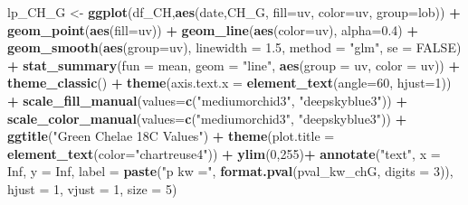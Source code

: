 \documentclass[
]{article}
\newenvironment{Shaded}{\begin{snugshade}}{\end{snugshade}}
\newcommand{\AttributeTok}[1]{\textcolor[rgb]{0.13,0.29,0.53}{#1}}
\newcommand{\ConstantTok}[1]{\textcolor[rgb]{0.56,0.35,0.01}{#1}}
\newcommand{\DecValTok}[1]{\textcolor[rgb]{0.00,0.00,0.81}{#1}}
\newcommand{\FloatTok}[1]{\textcolor[rgb]{0.00,0.00,0.81}{#1}}
\newcommand{\FunctionTok}[1]{\textcolor[rgb]{0.13,0.29,0.53}{\textbf{#1}}}
\newcommand{\NormalTok}[1]{#1}
\newcommand{\OtherTok}[1]{\textcolor[rgb]{0.56,0.35,0.01}{#1}}
\newcommand{\SpecialCharTok}[1]{\textcolor[rgb]{0.81,0.36,0.00}{\textbf{#1}}}
\newcommand{\StringTok}[1]{\textcolor[rgb]{0.31,0.60,0.02}{#1}}
\begin{document}
\begin{Shaded}
\begin{Highlighting}[]
\NormalTok{lp\_CH\_G }\OtherTok{\textless{}{-}} \FunctionTok{ggplot}\NormalTok{(df\_CH,}\FunctionTok{aes}\NormalTok{(date,CH\_G, }\AttributeTok{fill=}\NormalTok{uv, }\AttributeTok{color=}\NormalTok{uv, }\AttributeTok{group=}\NormalTok{lob)) }\SpecialCharTok{+}
  \FunctionTok{geom\_point}\NormalTok{(}\FunctionTok{aes}\NormalTok{(}\AttributeTok{fill=}\NormalTok{uv)) }\SpecialCharTok{+} \FunctionTok{geom\_line}\NormalTok{(}\FunctionTok{aes}\NormalTok{(}\AttributeTok{color=}\NormalTok{uv), }\AttributeTok{alpha=}\FloatTok{0.4}\NormalTok{) }\SpecialCharTok{+} 
  \FunctionTok{geom\_smooth}\NormalTok{(}\FunctionTok{aes}\NormalTok{(}\AttributeTok{group=}\NormalTok{uv), }\AttributeTok{linewidth =} \FloatTok{1.5}\NormalTok{, }\AttributeTok{method =} \StringTok{"glm"}\NormalTok{, }\AttributeTok{se =} \ConstantTok{FALSE}\NormalTok{) }\SpecialCharTok{+}
  \FunctionTok{stat\_summary}\NormalTok{(}\AttributeTok{fun =}\NormalTok{ mean, }\AttributeTok{geom =} \StringTok{"line"}\NormalTok{, }\FunctionTok{aes}\NormalTok{(}\AttributeTok{group =}\NormalTok{ uv, }\AttributeTok{color =}\NormalTok{ uv)) }\SpecialCharTok{+}
  \FunctionTok{theme\_classic}\NormalTok{() }\SpecialCharTok{+}
  \FunctionTok{theme}\NormalTok{(}\AttributeTok{axis.text.x =} \FunctionTok{element\_text}\NormalTok{(}\AttributeTok{angle=}\DecValTok{60}\NormalTok{, }\AttributeTok{hjust=}\DecValTok{1}\NormalTok{)) }\SpecialCharTok{+}
  \FunctionTok{scale\_fill\_manual}\NormalTok{(}\AttributeTok{values=}\FunctionTok{c}\NormalTok{(}\StringTok{"mediumorchid3"}\NormalTok{, }\StringTok{"deepskyblue3"}\NormalTok{)) }\SpecialCharTok{+}
  \FunctionTok{scale\_color\_manual}\NormalTok{(}\AttributeTok{values=}\FunctionTok{c}\NormalTok{(}\StringTok{"mediumorchid3"}\NormalTok{, }\StringTok{"deepskyblue3"}\NormalTok{)) }\SpecialCharTok{+}
  \FunctionTok{ggtitle}\NormalTok{(}\StringTok{"Green Chelae 18C Values"}\NormalTok{) }\SpecialCharTok{+} 
  \FunctionTok{theme}\NormalTok{(}\AttributeTok{plot.title =} \FunctionTok{element\_text}\NormalTok{(}\AttributeTok{color=}\StringTok{"chartreuse4"}\NormalTok{)) }\SpecialCharTok{+}
  \FunctionTok{ylim}\NormalTok{(}\DecValTok{0}\NormalTok{,}\DecValTok{255}\NormalTok{)}\SpecialCharTok{+}
  \FunctionTok{annotate}\NormalTok{(}\StringTok{"text"}\NormalTok{, }\AttributeTok{x =} \ConstantTok{Inf}\NormalTok{, }\AttributeTok{y =} \ConstantTok{Inf}\NormalTok{, }
           \AttributeTok{label =} \FunctionTok{paste}\NormalTok{(}\StringTok{"p kw ="}\NormalTok{, }\FunctionTok{format.pval}\NormalTok{(pval\_kw\_chG, }\AttributeTok{digits =} \DecValTok{3}\NormalTok{)),}
           \AttributeTok{hjust =} \DecValTok{1}\NormalTok{, }\AttributeTok{vjust =} \DecValTok{1}\NormalTok{, }\AttributeTok{size =} \DecValTok{5}\NormalTok{)}


\end{Highlighting}
\end{Shaded}
\end{document}
